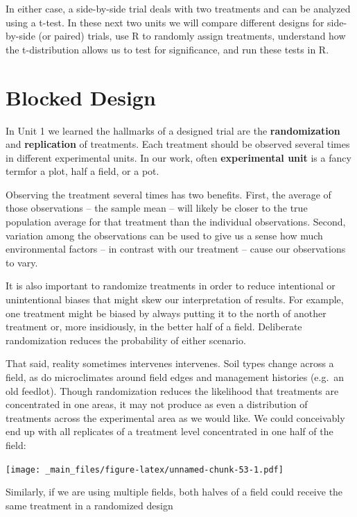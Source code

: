 \documentclass[
]{book}
\begin{document}
In either case, a side-by-side trial deals with two treatments and can
be analyzed using a t-test. In these next two units we will compare
different designs for side-by-side (or paired) trials, use R to randomly
assign treatments, understand how the t-distribution allows us to test
for significance, and run these tests in R.

\hypertarget{blocked-design}{%
\section{Blocked Design}\label{blocked-design}}

In Unit 1 we learned the hallmarks of a designed trial are the
\textbf{randomization} and \textbf{replication} of treatments. Each treatment
should be observed several times in different experimental units. In our
work, often \textbf{experimental unit} is a fancy termfor a plot, half a
field, or a pot.

Observing the treatment several times has two benefits. First, the
average of those observations -- the sample mean -- will likely be
closer to the true population average for that treatment than the
individual observations. Second, variation among the observations can be
used to give us a sense how much environmental factors -- in contrast
with our treatment -- cause our observations to vary.

It is also important to randomize treatments in order to reduce
intentional or unintentional biases that might skew our interpretation
of results. For example, one treatment might be biased by always putting
it to the north of another treatment or, more insidiously, in the better
half of a field. Deliberate randomization reduces the probability of
either scenario.

That said, reality sometimes intervenes intervenes. Soil types change
across a field, as do microclimates around field edges and management
histories (e.g.~an old feedlot). Though randomization reduces the
likelihood that treatments are concentrated in one areas, it may not
produce as even a distribution of treatments across the experimental
area as we would like. We could conceivably end up with all replicates
of a treatment level concentrated in one half of the field:

\texttt{[image: \_main\_files/figure-latex/unnamed-chunk-53-1.pdf]}

Similarly, if we are using multiple fields, both halves of a field could
receive the same treatment in a randomized design
\end{document}
